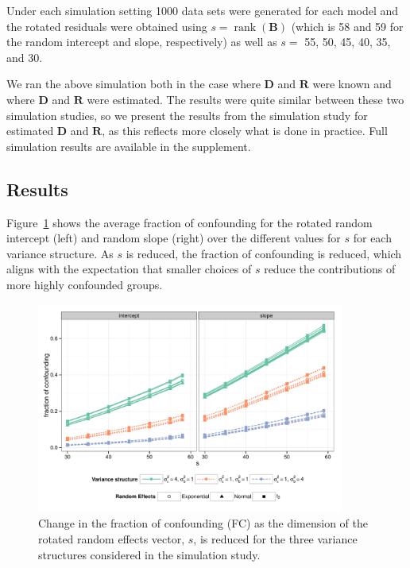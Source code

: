 \documentclass[12pt]{article} %
\DeclareMathOperator{\rank}{rank}
\begin{document}
Under each simulation setting 1000 data sets were generated for each model and the rotated residuals were obtained using $s = \rank(\bm{B})$ (which is 58 and 59 for the random intercept and slope, respectively) as well as $s =$ 55, 50, 45, 40, 35, and 30. 

We ran the above simulation both in the case where $\bm{D}$ and $\bm{R}$ were known and where $\bm{D}$ and $\bm{R}$ were estimated. The results were quite similar between these two simulation studies, so we present the results from the simulation study for estimated  $\bm{D}$ and $\bm{R}$, as this reflects more closely what is done in practice. Full simulation results are available in the supplement.


\subsection{Results}\label{sec:sim-results}
\noindent
Figure~\ref{fig:fc} shows the average fraction of confounding for the rotated random intercept (left) and random slope (right) over the different values for $s$ for each variance structure. As $s$ is reduced, the fraction of confounding is reduced, which aligns with the expectation that smaller choices of $s$ reduce the contributions of more highly confounded groups.

\begin{figure}[h]
	\centering
	\includegraphics[width=0.9\textwidth]{fc_by_s.pdf}
	\caption{\label{fig:fc} Change in the fraction of confounding (FC) as the dimension of the rotated random effects vector, $s$, is reduced for the three variance structures considered in the simulation study. %
	}
\end{figure}
\end{document}
